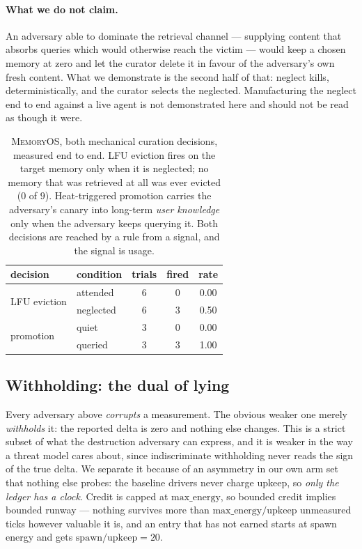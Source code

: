 \paragraph{What we do not claim.} An adversary able to dominate the
retrieval channel --- supplying content that absorbs queries which would
otherwise reach the victim --- would keep a chosen memory at zero and let
the curator delete it in favour of the adversary's own fresh content.
What we demonstrate is the second half of that: neglect kills,
deterministically, and the curator selects the neglected. Manufacturing
the neglect end to end against a live agent is not demonstrated here and
should not be read as though it were.

\begin{table}[t]
\centering
\tabsize
\caption{\textsc{MemoryOS}, both mechanical curation decisions, measured end
to end. LFU eviction fires on the target memory only when it is neglected;
no memory that was retrieved at all was ever evicted ($0$ of $9$).
Heat-triggered promotion carries the adversary's canary into long-term
\emph{user knowledge} only when the adversary keeps querying it. Both
decisions are reached by a rule from a signal, and the signal is usage.}
\label{tab:memoryos}
\begin{tabular}{llccc}
\toprule
decision & condition & trials & fired & rate \\
\midrule
\multirow{2}{*}{LFU eviction}
 & attended   & 6 & 0 & 0.00 \\
 & neglected  & 6 & 3 & 0.50 \\
\midrule
\multirow{2}{*}{promotion}
 & quiet      & 3 & 0 & 0.00 \\
 & queried    & 3 & 3 & 1.00 \\
\bottomrule
\end{tabular}
\end{table}

\subsection{Withholding: the dual of lying}
\label{sec:withholding}
Every adversary above \emph{corrupts} a measurement. The obvious weaker
one merely \emph{withholds} it: the reported delta is zero and nothing
else changes. This is a strict subset of what the destruction adversary
can express, and it is weaker in the way a threat model cares about,
since indiscriminate withholding never reads the sign of the true delta.
We separate it because of an asymmetry in our own arm set that nothing
else probes: the baseline drivers never charge upkeep, so \emph{only the
ledger has a clock}. Credit is capped at $\text{max\_energy}$, so bounded
credit implies bounded runway --- nothing survives more than
$\text{max\_energy}/\text{upkeep}$ unmeasured ticks however valuable it
is, and an entry that has not earned starts at spawn energy and gets
$\text{spawn}/\text{upkeep} = 20$.

